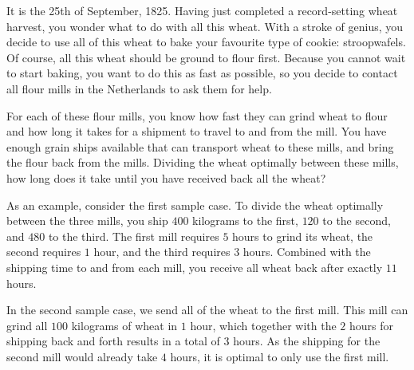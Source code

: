 





It is the 25th of September, 1825.
Having just completed a record-setting wheat harvest,
you wonder what to do with all this wheat.
With a stroke of genius, you decide to use all of this wheat to bake your favourite type of cookie: stroopwafels.
Of course, all this wheat should be ground to flour first.
Because you cannot wait to start baking, you want to do this as fast as possible,
so you decide to contact all flour mills in the Netherlands to ask them for help.

For each of these flour mills,
you know how fast they can grind wheat to flour
and how long it takes for a shipment to travel to and from the mill.
You have enough grain ships available that can transport wheat to these mills,
and bring the flour back from the mills.
Dividing the wheat optimally between these mills,
how long does it take until you have received back all the wheat?

As an example, consider the first sample case.
To divide the wheat optimally between the three mills,
you ship $400$ kilograms to the first, $120$ to the second, and $480$ to the third.
The first mill requires $5$ hours to grind its wheat,
the second requires $1$ hour, and the third requires $3$ hours.
Combined with the shipping time to and from each mill,
you receive all wheat back after exactly $11$ hours.

In the second sample case, we send all of the wheat to the first mill.
This mill can grind all $100$ kilograms of wheat in $1$ hour,
which together with the $2$ hours for shipping back and forth results in a total of $3$ hours.
As the shipping for the second mill would already take $4$ hours, it is optimal to only use the first mill.

